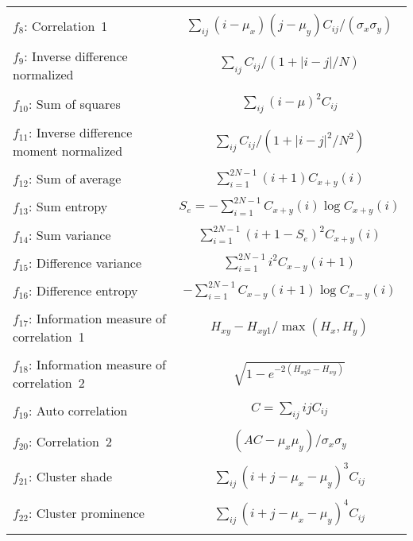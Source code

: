 \begin{longtable}{lc}
	& \\[-1ex]
	$f_{8}$: Correlation~1 & $\sum_{ij}(i-\mu_{x})(j-\mu_{y})C_{ij}/(\sigma_{x}\sigma_{y})$\\
	& \\[-1ex] 	
	$f_{9}$: Inverse difference normalized & $\sum_{ij}C_{ij}/(1+|i-j|/N)$\\
	& \\[-1ex]
	$f_{10}$: Sum of squares & $\sum_{ij} (i-\mu)^{2}C_{ij}$ \\
	& \\[-1ex]				
	$f_{11}$: Inverse difference moment normalized & $\sum_{ij}C_{ij}/(1+|i-j|^{2}/N^{2})$\\
	& \\[-1ex]
	$f_{12}$: Sum of average & $\sum_{i=1}^{2N-1}(i+1)C_{x+y}(i)$\\
	& \\[-1ex]
	$f_{13}$: Sum entropy & $S_{e} = -\sum_{i=1}^{2N-1}C_{x+y}(i)\log C_{x+y}(i)$\\
	& \\[-1ex]
	$f_{14}$: Sum variance & $\sum_{i=1}^{2N-1}(i+1-S_{e})^{2}C_{x+y}(i)$\\
	& \\[-1ex]
	$f_{15}$: Difference variance & $\sum_{i=1}^{2N-1}i^{2}C_{x-y}(i+1)$\\
	& \\[-1ex]
	$f_{16}$: Difference entropy & $-\sum_{i=1}^{2N-1} C_{x-y}(i+1)\log C_{x-y}(i)$\\
	& \\[-1ex]
	$f_{17}$: Information measure of correlation~1 & $H_{xy}-H_{xy1}/\max(H_{x},H_{y})$ \\
	& \\[-1ex]
	$f_{18}$: Information measure of correlation~2 & $\sqrt{1-e^{-2(H_{xy2}-H_{xy})}}$\\
	& \\[-1ex]
	$f_{19}$: Auto correlation & $C = \sum_{ij}ijC_{ij}$\\
	& \\[-1ex]	
	$f_{20}$: Correlation~2 &  $(AC-\mu_{x}\mu_{y})/\sigma_{x}\sigma_{y}$ \\
	& \\[-1ex]	
	$f_{21}$: Cluster shade & $\sum_{ij} (i+j-\mu_{x}-\mu_{y})^{3}C_{ij}$\\
	& \\[-1ex]	
	$f_{22}$: Cluster prominence & $\sum_{ij} (i+j-\mu_{x}-\mu_{y})^{4}C_{ij}$\\
	\bottomrule
	\label{tab:glcmfeatures}
  	\end{longtable}
